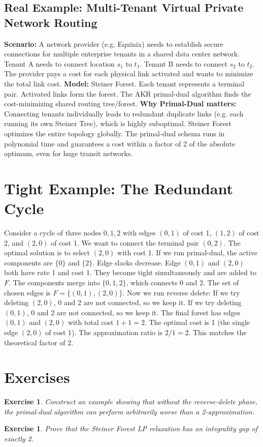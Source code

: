 \documentclass[11pt,oneside]{book}
\newtheorem{exercise}[theorem]{Exercise}
\begin{document}
\subsection*{Real Example: Multi-Tenant Virtual Private Network Routing}
\textbf{Scenario:} A network provider (e.g. Equinix) needs to establish secure connections for multiple enterprise tenants in a shared data center network. Tenant A needs to connect location $s_1$ to $t_1$. Tenant B needs to connect $s_2$ to $t_2$. The provider pays a cost for each physical link activated and wants to minimize the total link cost.
\textbf{Model:} Steiner Forest. Each tenant represents a terminal pair. Activated links form the forest. The AKR primal-dual algorithm finds the cost-minimizing shared routing tree/forest.
\textbf{Why Primal-Dual matters:} Connecting tenants individually leads to redundant duplicate links (e.g. each running its own Steiner Tree), which is highly suboptimal. Steiner Forest optimizes the entire topology globally. The primal-dual schema runs in polynomial time and guarantees a cost within a factor of 2 of the absolute optimum, even for huge transit networks.

\section{Tight Example: The Redundant Cycle}
Consider a cycle of three nodes $0, 1, 2$ with edges $(0, 1)$ of cost 1, $(1, 2)$ of cost 2, and $(2, 0)$ of cost 1. We want to connect the terminal pair $(0, 2)$.
The optimal solution is to select $(2, 0)$ with cost 1.
If we run primal-dual, the active components are $\{0\}$ and $\{2\}$. Edge slacks decrease. Edge $(0, 1)$ and $(2, 0)$ both have rate 1 and cost 1. They become tight simultaneously and are added to $F$. The components merge into $\{0, 1, 2\}$, which connects $0$ and $2$.
The set of chosen edges is $F = \{(0, 1), (2, 0)\}$.
Now we run reverse delete:
If we try deleting $(2, 0)$, $0$ and $2$ are not connected, so we keep it. If we try deleting $(0, 1)$, $0$ and $2$ are not connected, so we keep it.
The final forest has edges $(0, 1)$ and $(2, 0)$ with total cost $1 + 1 = 2$.
The optimal cost is 1 (the single edge $(2, 0)$ of cost 1).
The approximation ratio is $2 / 1 = 2$. This matches the theoretical factor of 2.

\section{Exercises}
\begin{exercise}
Construct an example showing that without the reverse-delete phase, the primal-dual algorithm can perform arbitrarily worse than a 2-approximation.
\end{exercise}
\begin{exercise}
Prove that the Steiner Forest LP relaxation has an integrality gap of exactly 2.
\end{exercise}
\end{document}
